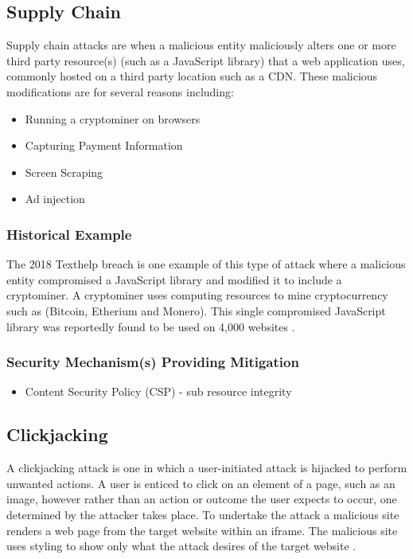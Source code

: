 \documentclass{mscreport}
\begin{document}
\subsection{Supply Chain}
\label{subsection:SupplyChain}

Supply chain attacks are when a malicious entity maliciously alters one or more third party resource(s) (such as a JavaScript library) that a web application uses, commonly hosted on a third party location such as a CDN. These malicious modifications are for several reasons including:

\begin{itemize}
	\setlength\itemsep{0.1em}
	\item Running a cryptominer \cite{Tekiner2021-sq} on browsers
	\item Capturing Payment Information
	\item Screen Scraping
	\item Ad injection
\end{itemize}

\subsubsection{Historical Example}
The 2018 Texthelp breach is one example of this type of attack where a malicious entity compromised a JavaScript library and modified it to include a cryptominer. A cryptominer uses computing resources to mine cryptocurrency such as (Bitcoin, Etherium and Monero). This single compromised JavaScript library was reportedly found to be used on 4,000 websites \cite{Billman2018-sq}.

\subsubsection{Security Mechanism(s) Providing Mitigation}

\begin{itemize}
	\setlength\itemsep{0.1em}
	\item Content Security Policy (CSP) - sub resource integrity
\end{itemize}

\subsection{Clickjacking}

A clickjacking attack is one in which a user-initiated attack is hijacked to perform unwanted actions. A user is enticed to click on an element of a page, such as an image, however rather than an action or outcome the user expects to occur, one determined by the attacker takes place. To undertake the attack a malicious site renders a web page from the target website within an iframe. The malicious site uses styling to show only what the attack desires of the target website \cite{Jamwal2018-tz}.
\end{document}
